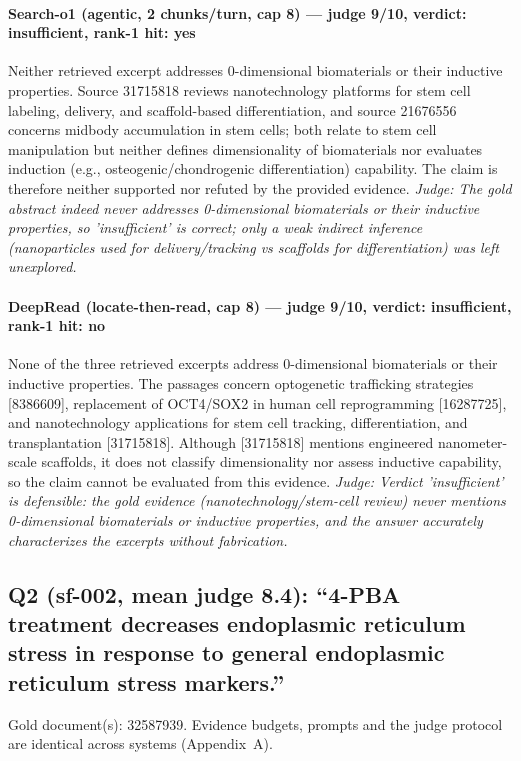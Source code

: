 \documentclass[sigconf, review, anonymous]{acmart}
\begin{document}
\paragraph{Search-o1 (agentic, 2 chunks/turn, cap 8) --- judge 9/10, verdict: insufficient, rank-1 hit: yes}
\noindent Neither retrieved excerpt addresses 0-dimensional biomaterials or their inductive properties. Source 31715818 reviews nanotechnology platforms for stem cell labeling, delivery, and scaffold-based differentiation, and source 21676556 concerns midbody accumulation in stem cells; both relate to stem cell manipulation but neither defines dimensionality of biomaterials nor evaluates induction (e.g., osteogenic/chondrogenic differentiation) capability. The claim is therefore neither supported nor refuted by the provided evidence.
\noindent\small\textit{Judge: The gold abstract indeed never addresses 0-dimensional biomaterials or their inductive properties, so 'insufficient' is correct; only a weak indirect inference (nanoparticles used for delivery/tracking vs scaffolds for differentiation) was left unexplored.}
\paragraph{DeepRead (locate-then-read, cap 8) --- judge 9/10, verdict: insufficient, rank-1 hit: no}
\noindent None of the three retrieved excerpts address 0-dimensional biomaterials or their inductive properties. The passages concern optogenetic trafficking strategies [8386609], replacement of OCT4/SOX2 in human cell reprogramming [16287725], and nanotechnology applications for stem cell tracking, differentiation, and transplantation [31715818]. Although [31715818] mentions engineered nanometer-scale scaffolds, it does not classify dimensionality nor assess inductive capability, so the claim cannot be evaluated from this evidence.
\noindent\small\textit{Judge: Verdict 'insufficient' is defensible: the gold evidence (nanotechnology/stem-cell review) never mentions 0-dimensional biomaterials or inductive properties, and the answer accurately characterizes the excerpts without fabrication.}

\subsection{Q2 (sf-002, mean judge 8.4): ``4-PBA treatment decreases endoplasmic reticulum stress in response to general endoplasmic reticulum stress markers.''}
\label{app:q2}
\noindent Gold document(s): 32587939. Evidence budgets, prompts and the judge protocol are identical across systems (Appendix~A).
\end{document}
